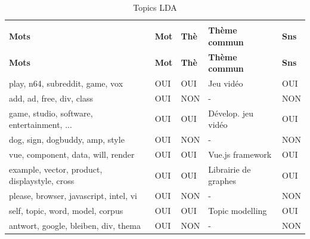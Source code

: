 \begin{longtable}{lllll}
\caption{Topics LDA}\\
\label{table-lda}\\
\textbf{Mots}                                      & \textbf{Mot}                                       & \textbf{Thè}                & \textbf{Thème commun}            & \textbf{Sns}               \\ \hline \endfirsthead
\textbf{Mots}                                      & \textbf{Mot}                                       & \textbf{Thè}                & \textbf{Thème commun}            & \textbf{Sns}               \\ \hline \endhead 
\scriptsize play, n64, subreddit, game, vox                    & \cellcolor[HTML]{9AFF99}OUI & \cellcolor[HTML]{9AFF99}OUI & Jeu vidéo                 & \cellcolor[HTML]{9AFF99}OUI \\
\scriptsize add, ad, free, div, class                          & \cellcolor[HTML]{9AFF99}OUI & \cellcolor[HTML]{FFCCC9}NON & -                         & \cellcolor[HTML]{FFCCC9}NON \\
\scriptsize game, studio, software, entertainment, ... & \cellcolor[HTML]{9AFF99}OUI & \cellcolor[HTML]{9AFF99}OUI & Dévelop. jeu vidéo            & \cellcolor[HTML]{9AFF99}OUI \\
\scriptsize dog, sign, dogbuddy, amp, style                    & \cellcolor[HTML]{9AFF99}OUI & \cellcolor[HTML]{FFCCC9}NON & -                         & \cellcolor[HTML]{FFCCC9}NON \\
\scriptsize vue, component, data, will, render                 & \cellcolor[HTML]{9AFF99}OUI & \cellcolor[HTML]{9AFF99}OUI & Vue.js framework          & \cellcolor[HTML]{9AFF99}OUI \\
\scriptsize example, vector, product, displaystyle, cross      & \cellcolor[HTML]{9AFF99}OUI & \cellcolor[HTML]{9AFF99}OUI & Librairie de graphes      & \cellcolor[HTML]{9AFF99}OUI \\
\scriptsize please, browser, javascript, intel, vi             & \cellcolor[HTML]{9AFF99}OUI & \cellcolor[HTML]{FFCCC9}NON & -                         & \cellcolor[HTML]{FFCCC9}NON \\
\scriptsize self, topic, word, model, corpus                   & \cellcolor[HTML]{9AFF99}OUI & \cellcolor[HTML]{9AFF99}OUI & Topic modelling           & \cellcolor[HTML]{9AFF99}OUI \\
\scriptsize antwort, google, bleiben, div, thema               & \cellcolor[HTML]{9AFF99}OUI & \cellcolor[HTML]{FFCCC9}NON & -                         & \cellcolor[HTML]{FFCCC9}NON \\

\end{longtable}
